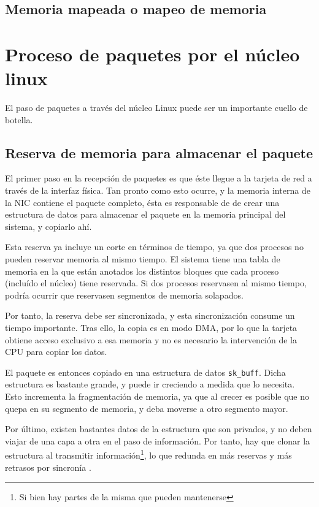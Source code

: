 \subsection{Memoria mapeada o mapeo de memoria}

\section{Proceso de paquetes por el núcleo linux}
El paso de paquetes a través del núcleo Linux puede ser un importante cuello de botella. %

\subsection{Reserva de memoria para almacenar el paquete}
El primer paso en la recepción de paquetes es que éste llegue a la tarjeta de red a través de la interfaz física. Tan 
pronto como esto ocurre, y la memoria interna de la \gls{NIC} contiene el paquete completo, ésta es responsable de 
de crear una estructura de datos para almacenar el paquete en la memoria principal del sistema, y copiarlo ahí.

Esta reserva ya incluye un corte en términos de tiempo, ya que dos procesos no pueden reservar memoria al mismo tiempo. 
El sistema tiene una tabla de memoria en la que están anotados los distintos bloques que cada proceso (incluído el 
núcleo) tiene reservada. Si dos procesos reservasen al mismo tiempo, podría ocurrir que reservasen segmentos de memoria 
solapados.

Por tanto, la reserva debe ser sincronizada, y esta sincronización consume un tiempo importante. Tras ello, la copia es 
en modo \gls{DMA}, por lo que la tarjeta obtiene acceso exclusivo a esa memoria y no es necesario la intervención de la 
CPU para copiar los datos.

El paquete es entonces copiado en una estructura de datos \texttt{sk\_buff}. Dicha estructura es bastante grande, y 
puede ir creciendo a medida que lo necesita. Esto incrementa la fragmentación de memoria, ya que al crecer es posible 
que no quepa en su segmento de memoria, y deba moverse a otro segmento mayor.

Por último, existen bastantes datos de la estructura que son privados, y no deben viajar de una capa a otra en el paso 
de información. Por tanto, hay que clonar la estructura al transmitir información\footnote{Si bien hay partes de la 
misma que pueden mantenerse}, lo que redunda en más reservas y más retrasos por sincronía
\cite{skBuffLinuxFoundation}.

